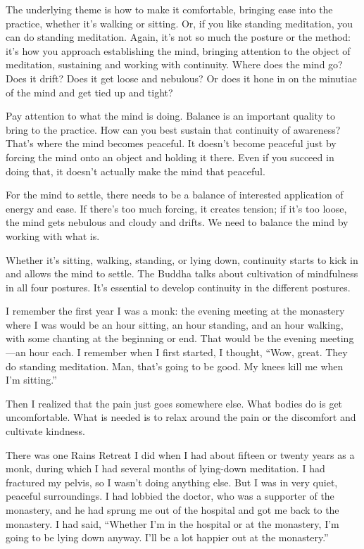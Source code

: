The underlying theme is how to make it comfortable, bringing ease into
the practice, whether it’s walking or sitting. Or, if you like standing
meditation, you can do standing meditation. Again, it’s not so much the
posture or the method: it’s how you approach establishing the mind,
bringing attention to the object of meditation, sustaining and working
with continuity. Where does the mind go? Does it drift? Does it get
loose and nebulous? Or does it hone in on the minutiae of the mind and
get tied up and tight?

Pay attention to what the mind is doing. Balance is an important quality
to bring to the practice. How can you best sustain that continuity of
awareness? That’s where the mind becomes peaceful. It doesn’t become
peaceful just by forcing the mind onto an object and holding it there.
Even if you succeed in doing that, it doesn’t actually make the mind
that peaceful.

For the mind to settle, there needs to be a balance of interested
application of energy and ease. If there’s too much forcing, it creates
tension; if it’s too loose, the mind gets nebulous and cloudy and
drifts. We need to balance the mind by working with what is.

Whether it’s sitting, walking, standing, or lying down, continuity
starts to kick in and allows the mind to settle. The Buddha talks about
cultivation of mindfulness in all four postures. It’s essential to
develop continuity in the different postures.

I remember the first year I was a monk: the evening meeting at the
monastery where I was would be an hour sitting, an hour standing, and an
hour walking, with some chanting at the beginning or end. That would be
the evening meeting—an hour each. I remember when I first started, I
thought, “Wow, great. They do standing meditation. Man, that’s going to
be good. My knees kill me when I’m sitting.”

Then I realized that the pain just goes somewhere else. What bodies do
is get uncomfortable. What is needed is to relax around the pain or the
discomfort and cultivate kindness.

There was one Rains Retreat I did when I had about fifteen or twenty
years as a monk, during which I had several months of lying-down
meditation. I had fractured my pelvis, so I wasn’t doing anything else.
But I was in very quiet, peaceful surroundings. I had lobbied the
doctor, who was a supporter of the monastery, and he had sprung me out
of the hospital and got me back to the monastery. I had said, “Whether
I’m in the hospital or at the monastery, I’m going to be lying down
anyway. I’ll be a lot happier out at the monastery.”


